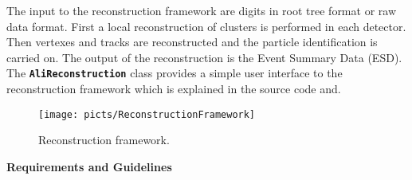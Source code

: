 \documentclass[12pt,a4paper,twoside]{article}
\newcommand{\class}[1]{\texttt{\textbf{#1}}\xspace}
\begin{document}
The input to the reconstruction framework are digits in root tree
format or raw data format. First a local reconstruction of clusters is
performed in each detector. Then vertexes and tracks are reconstructed
and the particle identification is carried on. The output of the reconstruction
is the Event Summary Data (ESD). The \class{AliReconstruction} class provides
a simple user interface to the reconstruction framework which is
explained in the source code and. 

\begin{figure}[ht]
  \centering
  \texttt{[image: picts/ReconstructionFramework]}
  \caption{Reconstruction framework.} \label{MC:Reconstruction}
\end{figure}

\textbf{Requirements and Guidelines}
\end{document}
